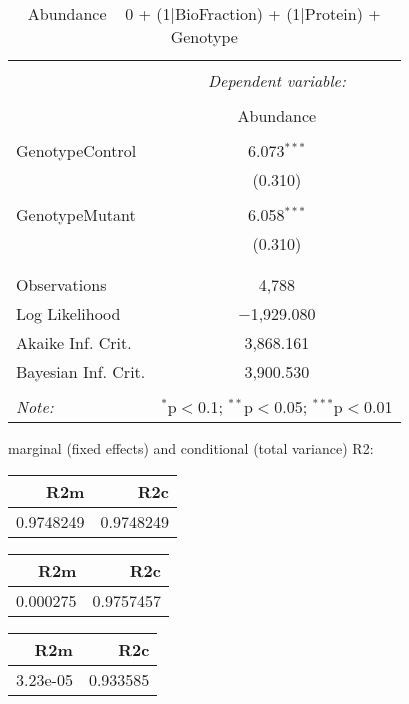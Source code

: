 \documentclass[11pt]{report}
\begin{document}
\begin{table}[!htbp] \centering 
  \caption{Abundance ~ 0 + (1|BioFraction) + (1|Protein) + Genotype} 
  \label{} 
\begin{tabular}{@{\extracolsep{5pt}}lc} 
\\[-1.8ex]\hline 
\hline \\[-1.8ex] 
 & \multicolumn{1}{c}{\textit{Dependent variable:}} \\ 
\cline{2-2} 
\\[-1.8ex] & Abundance \\ 
\hline \\[-1.8ex] 
 GenotypeControl & 6.073$^{***}$ \\ 
  & (0.310) \\ 
  & \\ 
 GenotypeMutant & 6.058$^{***}$ \\ 
  & (0.310) \\ 
  & \\ 
\hline \\[-1.8ex] 
Observations & 4,788 \\ 
Log Likelihood & $-$1,929.080 \\ 
Akaike Inf. Crit. & 3,868.161 \\ 
Bayesian Inf. Crit. & 3,900.530 \\ 
\hline 
\hline \\[-1.8ex] 
\textit{Note:}  & \multicolumn{1}{r}{$^{*}$p$<$0.1; $^{**}$p$<$0.05; $^{***}$p$<$0.01} \\ 
\end{tabular} 
\end{table} 
marginal (fixed effects) and conditional (total variance) R2:

\begin{tabular}{r|r}
\hline
R2m & R2c\\
\hline
0.9748249 & 0.9748249\\
\hline
\end{tabular}

\begin{tabular}{r|r}
\hline
R2m & R2c\\
\hline
0.000275 & 0.9757457\\
\hline
\end{tabular}

\begin{tabular}{r|r}
\hline
R2m & R2c\\
\hline
3.23e-05 & 0.933585\\
\hline
\end{tabular}
\end{document}
